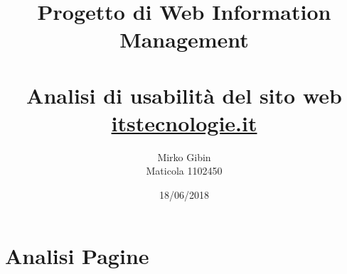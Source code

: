 \documentclass{article}
\author {Mirko Gibin \\ Maticola 1102450}
\date{18/06/2018}
\title {Progetto di Web Information Management \\ ~\\
\large Analisi di usabilità del sito web \\ \url{itstecnologie.it}}
\begin{document}
\maketitle
\tableofcontents
\newpage
	
	\newpage
	\section{Analisi Pagine}
	
	
	\newpage
	
	\newpage
	
\end{document}
